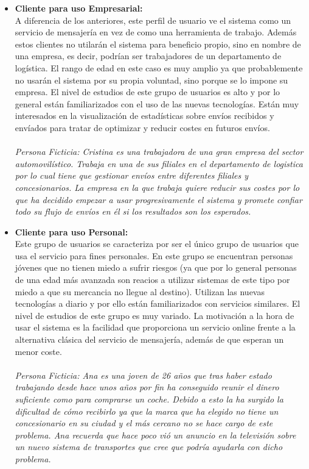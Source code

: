 \documentclass[10pt, a4paper,spanish]{article}
\begin{document}
\begin{itemize}
			\item \textbf{Cliente para uso Empresarial:} \\
				A diferencia de los anteriores, este perfil de usuario ve el sistema como un servicio de mensajería en vez de como una herramienta de trabajo. Además estos clientes no utilarán el sistema para beneficio propio, sino en nombre de una empresa, es decir, podrían ser trabajadores de un departamento de logística. El rango de edad en este caso es muy amplio ya que probablemente no usarán el sistema por su propia voluntad, sino porque se lo impone su empresa. El nivel de estudios de este grupo de usuarios es alto y por lo general están familiarizados con el uso de las nuevas tecnologías. Están muy interesados en la visualización de estadísticas sobre envíos recibidos y envíados para tratar de optimizar y reducir costes en futuros envíos.\\ \\
				\textit{Persona Ficticia: Cristina es una trabajadora de una gran empresa del sector automovilístico. Trabaja en una de sus filiales en el departamento de logistica por lo cual tiene que gestionar envíos entre diferentes filiales y concesionarios. La empresa en la que trabaja quiere reducir sus costes por lo que ha decidido empezar a usar progresivamente el sistema y promete confiar todo su flujo de envíos en él si los resultados son los esperados.}

			\item \textbf{Cliente para uso Personal:} \\
				Este grupo de usuarios se caracteriza por ser el único grupo de usuarios que usa el servicio para fines personales. En este grupo se encuentran personas jóvenes que no tienen miedo a sufrir riesgos (ya que por lo general personas de una edad más avanzada son reacios a utilizar sistemas de este tipo por miedo a que su mercancia no llegue al destino). Utilizan las nuevas tecnologías a diario y por ello están familiarizados con servicios similares. El nivel de estudios de este grupo es muy variado. La motivación a la hora de usar el sistema es la facilidad que proporciona un servicio online frente a la alternativa clásica del servicio de mensajería, además de que esperan un menor coste.\\ \\
				\textit{Persona Ficticia: Ana es una joven de 26 años que tras haber estado trabajando desde hace unos años por fin ha conseguido reunir el dinero suficiente como para comprarse un coche. Debido a esto la ha surgido la dificultad de cómo recibirlo ya que la marca que ha elegido no tiene un concesionario en su ciudad y el más cercano no se hace cargo de este problema. Ana recuerda que hace poco vió un anuncio en la televisión sobre un nuevo sistema de transportes que cree que podría ayudarla con dicho problema.}

		\end{itemize}
\end{document}
